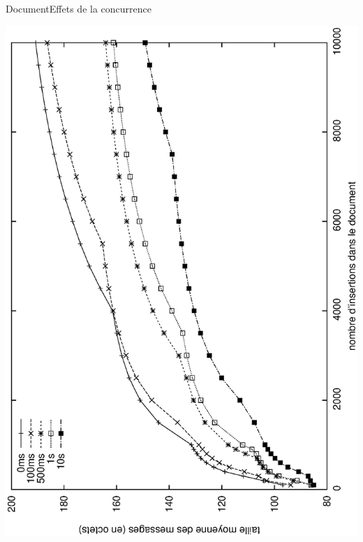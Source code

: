\begin{frame}{Document}{Effets de la concurrence}
  \vspace{-0.5cm}
  \begin{center}
    \includegraphics[angle=-90, width=\textwidth]{img/replication/latency.eps}
  \end{center}
\end{frame}



